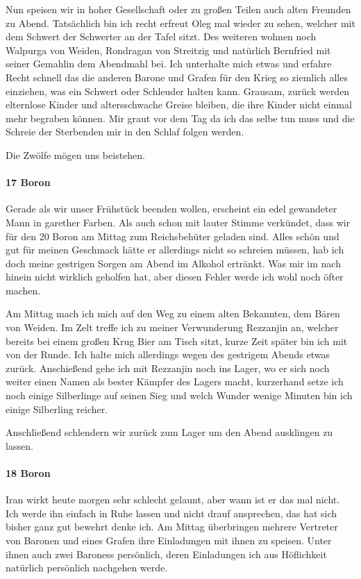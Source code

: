 Nun speisen wir in hoher Gesellschaft oder zu großen Teilen auch alten Freunden zu Abend. Tatsächlich bin ich recht erfreut Oleg mal wieder zu sehen, welcher mit dem Schwert der Schwerter an der Tafel sitzt. Des weiteren wohnen noch Walpurga von Weiden, Rondragan von Streitzig und natürlich Bernfried mit seiner Gemahlin dem Abendmahl bei. Ich unterhalte mich etwas und erfahre Recht schnell das die anderen Barone und Grafen für den Krieg so ziemlich alles einziehen, was ein Schwert oder Schleuder halten kann. Grausam, zurück werden elternlose Kinder und altersschwache Greise bleiben, die ihre Kinder nicht einmal mehr begraben können. Mir graut vor dem Tag da ich das selbe tun muss und die Schreie der Sterbenden mir in den Schlaf folgen werden.

Die Zwölfe mögen uns beistehen.

\paragraph{17 Boron}
Gerade als wir unser Frühstück beenden wollen, erscheint ein edel gewandeter Mann in garether Farben. Als auch schon mit lauter Stimme verkündet, dass wir für den 20 Boron am Mittag zum Reichsbehüter geladen sind. Alles schön und gut für meinen Geschmack hätte er allerdings nicht so schreien müssen, hab ich doch meine gestrigen Sorgen am Abend im Alkohol ertränkt. Was mir im nach hinein nicht wirklich geholfen hat, aber diesen Fehler werde ich wohl noch öfter machen.

Am Mittag mach ich mich auf den Weg zu einem alten Bekannten, dem Bären von Weiden. Im Zelt treffe ich zu meiner Verwunderung Rezzanjin an, welcher bereits bei einem großen Krug Bier am Tisch sitzt, kurze Zeit später bin ich mit von der Runde. Ich halte mich allerdings wegen des gestrigem Abends etwas zurück. Anschießend gehe ich mit Rezzanjin noch ins Lager, wo er sich noch weiter einen Namen als bester Kämpfer des Lagers macht, kurzerhand setze ich noch einige Silberlinge auf seinen Sieg und welch Wunder wenige Minuten bin ich einige Silberling reicher.

Anschließend schlendern wir zurück zum Lager um den Abend ausklingen zu lassen.


\paragraph{18 Boron}
Iran wirkt heute morgen sehr schlecht gelaunt, aber wann ist er das mal nicht. Ich werde ihn einfach in Ruhe lassen und nicht drauf ansprechen, das hat sich bisher ganz gut bewehrt denke ich. Am Mittag überbringen mehrere Vertreter von Baronen und eines Grafen ihre Einladungen mit ihnen zu speisen. Unter ihnen auch zwei Baroness persönlich, deren Einladungen ich aus Höflichkeit natürlich persönlich nachgehen werde.

